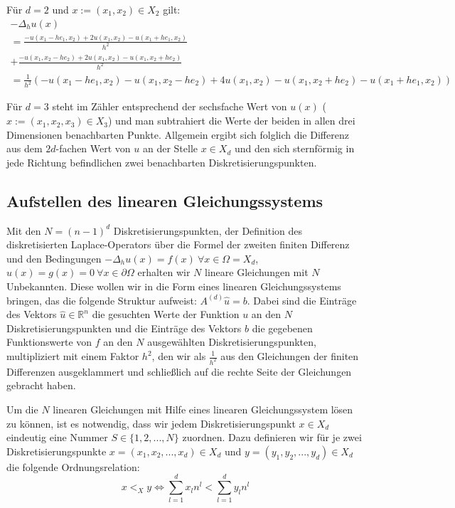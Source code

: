 \documentclass{scrartcl}
\newcommand{\R}{\mathbb{R}}
\begin{document}
Für $d=2$ und $x:=(x_1,x_2)\in X_2$ gilt:
\begin{align*}
-\Delta_h u(x) \\
= \frac{-u(x_1-he_1,x_2)+2u(x_1,x_2)-u(x_1+he_1,x_2)}{h^2}\ \\
+ \frac{-u(x_1,x_2-he_2)+2u(x_1,x_2)-u(x_1,x_2+he_2)}{h^2} \\
= \frac{1}{h^2} (-u(x_1-he_1,x_2)-u(x_1,x_2-he_2)+4u(x_1,x_2)-u(x_1,x_2+he_2)-u(x_1+he_1,x_2))
\end{align*}

Für $d=3$ steht im Zähler entsprechend der sechsfache Wert von $u(x)$ ($x:=(x_1,x_2, x_3)\in X_3$) und man subtrahiert die Werte der beiden in allen drei Dimensionen benachbarten Punkte. Allgemein ergibt sich folglich die Differenz aus dem $2d$-fachen Wert von $u$ an der Stelle $x \in X_d$ und den sich sternförmig in jede Richtung befindlichen zwei benachbarten Diskretisierungspunkten.

\subsection{Aufstellen des linearen Gleichungssystems}
Mit den $N=(n-1)^d$ Diskretisierungspunkten, der Definition des diskretisierten Laplace-Operators über die Formel der zweiten finiten Differenz und den Bedingungen
$-\Delta_h u(x) = f(x) \: \forall x \in \Omega = X_d$,
$u(x) = g(x) = 0 \: \forall x \in \partial\Omega$
erhalten wir $N$ lineare Gleichungen mit $N$ Unbekannten.
Diese wollen wir in die Form eines linearen Gleichungssystems bringen, das die folgende Struktur aufweist: $A^{(d)}\hat{u}=b$.
Dabei sind die Einträge des Vektors $\hat{u}\in\R^n$ die gesuchten Werte der Funktion $u$ an den $N$ Diskretisierungspunkten und die Einträge des Vektors $b$ die gegebenen Funktionswerte von $f$ an den $N$ ausgewählten Diskretisierungspunkten, multipliziert mit einem Faktor $h^2$, den wir als $\frac{1}{h^2}$ aus den Gleichungen der finiten Differenzen ausgeklammert und schließlich auf die rechte Seite der Gleichungen gebracht haben.

Um die $N$ linearen Gleichungen mit Hilfe eines linearen Gleichungssystem lösen zu können, ist es notwendig, dass wir jedem Diskretisierungspunkt $x \in X_d$ eindeutig eine Nummer $S \in \lbrace1, 2, ..., N\rbrace$ zuordnen. Dazu definieren wir für je zwei Diskretisierungspunkte $x=(x_1, x_2, ..., x_d) \in X_d$ und $y=(y_1, y_2, ..., y_d) \in X_d$ die folgende Ordnungsrelation:
\[x <_X y \iff \sum_{l=1}^d x_l n^l < \sum_{l=1}^d y_l n^l\]
\end{document}
